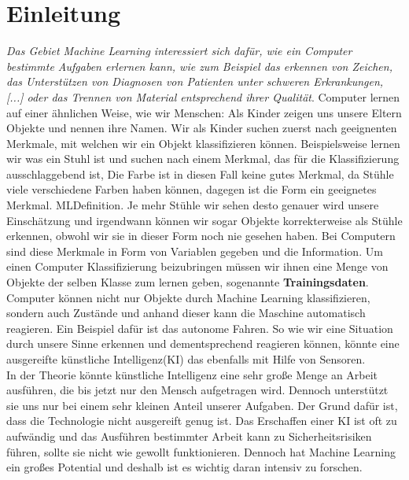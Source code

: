 \section{Einleitung}


\textit{Das Gebiet Machine Learning interessiert sich dafür, wie ein Computer bestimmte Aufgaben erlernen kann, wie zum Beispiel das erkennen von Zeichen, das Unterstützen von Diagnosen von Patienten unter schweren Erkrankungen, [...] oder das Trennen von Material entsprechend ihrer Qualität}\citep{MLDefinition}. Computer lernen auf einer ähnlichen Weise, wie wir Menschen: Als Kinder zeigen uns unsere Eltern Objekte und nennen ihre Namen. Wir als Kinder suchen zuerst nach geeignenten Merkmale, mit welchen wir ein Objekt klassifizieren können. Beispielsweise lernen wir was ein Stuhl ist und suchen nach einem Merkmal, das für die Klassifizierung ausschlaggebend ist, Die Farbe ist in diesen Fall keine gutes Merkmal, da Stühle viele verschiedene Farben haben können, dagegen ist die Form ein geeignetes Merkmal. {MLDefinition}. Je mehr Stühle wir sehen desto genauer wird unsere Einschätzung und irgendwann können wir sogar Objekte korrekterweise als Stühle erkennen, obwohl wir sie in dieser Form noch nie gesehen haben. Bei Computern sind diese Merkmale in Form von Variablen gegeben und die Information. Um einen Computer Klassifizierung beizubringen müssen wir ihnen eine Menge von Objekte der selben Klasse zum lernen geben, sogenannte \textbf{Trainingsdaten}. Computer können nicht nur Objekte durch Machine Learning klassifizieren, sondern auch Zustände und anhand dieser kann die Maschine automatisch reagieren. Ein Beispiel dafür ist das autonome Fahren. So wie wir eine Situation durch unsere Sinne erkennen und dementsprechend reagieren können, könnte eine ausgereifte künstliche Intelligenz(KI) das ebenfalls mit Hilfe von Sensoren.\\

In der Theorie könnte künstliche Intelligenz eine sehr große Menge an Arbeit ausführen, die bis jetzt nur den Mensch aufgetragen wird. Dennoch unterstützt sie uns nur bei einem sehr kleinen Anteil unserer Aufgaben. Der Grund dafür ist, dass die Technologie nicht ausgereift genug ist. Das Erschaffen einer KI ist oft zu aufwändig und das Ausführen bestimmter Arbeit kann zu Sicherheitsrisiken führen, sollte sie nicht wie gewollt funktionieren. Dennoch hat Machine Learning ein großes Potential und deshalb ist es wichtig daran intensiv zu forschen. 


